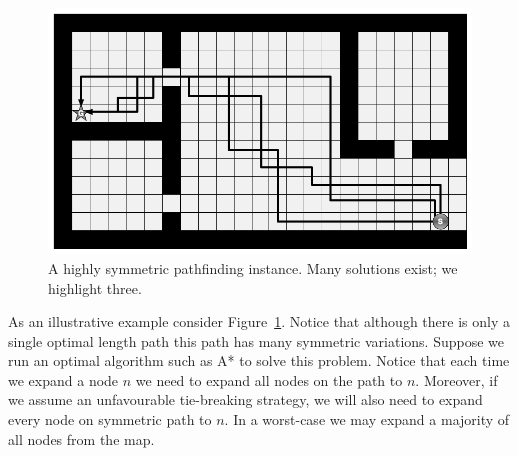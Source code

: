 \begin{figure}[tb]
\begin{center}
\includegraphics[scale=0.30, trim = 10mm 10mm 10mm 0mm]{chapter_rsr/diagrams/symmetry.png}
\end{center}
\vspace{-3pt}
\caption{A highly symmetric pathfinding instance. Many solutions exist; we highlight three. }
\label{fig::rsr::symmetry}
\end{figure}

As an illustrative example consider Figure~\ref{fig::rsr::symmetry}. Notice that although there 
is only a single optimal length path this path has many symmetric variations. 
Suppose we run an optimal algorithm such as A* to solve this problem. Notice that each time 
we expand a node $n$ we need to expand all nodes on the path to $n$. Moreover, if we assume an 
unfavourable tie-breaking strategy, we will also need to expand every node on symmetric path 
to $n$. In a worst-case we may expand a majority of all nodes from the map.

